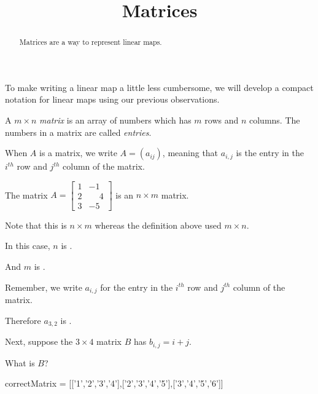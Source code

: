 \documentclass{ximera}
\title{Matrices}
\begin{document}
\begin{abstract}
  Matrices are a way to represent linear maps.
\end{abstract}

To make writing a linear map a little less cumbersome, we will develop a compact notation for linear maps using our previous observations.
	
\begin{definition}
  A $m \times n$ \textit{matrix} is an array of numbers which has $m$ rows and $n$ columns.  The numbers in a matrix are called \textit{entries}.

  When $A$ is a matrix, we write $A = (a_{ij})$, meaning that $a_{i,j}$ is the entry in the $i^{th}$  row and $j^{th}$ column of the matrix.
\end{definition}

\begin{question}
  The matrix $A = \begin{bmatrix}
    1&-1\\2&\phantom{-}4\\3&-5
  \end{bmatrix}$
  is an $n \times m$ matrix.  

  \begin{solution}
    \begin{hint}
      Note that this is $n \times m$ whereas the definition above used $m \times n$.
    \end{hint}

    In this case, $n$ is .
  \end{solution}

  \begin{solution}
    And $m$ is .
  \end{solution}

  Remember, we write $a_{i,j}$ for the entry in the $i^{th}$ row and $j^{th}$ column of the matrix.

  \begin{solution}
    Therefore $a_{3,2}$ is .
  \end{solution}

  Next, suppose the $3 \times 4$ matrix $B$ has $b_{i,j} = i+j$.

  \begin{solution}
    What is $B$?

    \begin{matrix-answer}[name=B]
      correctMatrix = [['1','2','3','4'],['2','3','4','5'],['3','4','5','6']]
    \end{matrix-answer}
  \end{solution}
\end{question}
\end{document}
